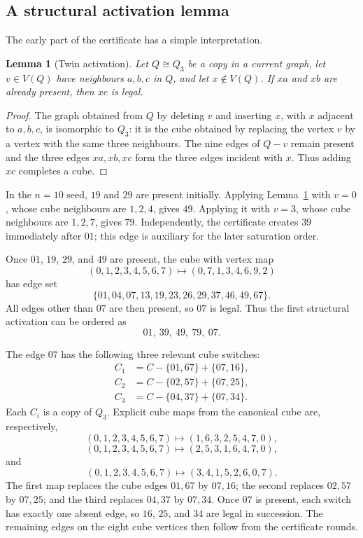 \documentclass[11pt]{article}
\numberwithin{equation}{section}
\newtheorem{lemma}[theorem]{Lemma}
\begin{document}
\subsection{A structural activation lemma}
The early part of the certificate has a simple interpretation.

\begin{lemma}[Twin activation]\label{lem:twin}
Let $Q\cong Q_3$ be a copy in a current graph, let $v\in V(Q)$ have neighbours $a,b,c$ in $Q$, and let $x\notin V(Q)$. If $xa$ and $xb$ are already present, then $xc$ is legal.
\end{lemma}

\begin{proof}
The graph obtained from $Q$ by deleting $v$ and inserting $x$, with $x$ adjacent to $a,b,c$, is isomorphic to $Q_3$: it is the cube obtained by replacing the vertex $v$ by a vertex with the same three neighbours. The nine edges of $Q-v$ remain present and the three edges $xa,xb,xc$ form the three edges incident with $x$. Thus adding $xc$ completes a cube.
\end{proof}

In the $n=10$ seed, $19$ and $29$ are present initially. Applying Lemma~\ref{lem:twin} with $v=0$, whose cube neighbours are $1,2,4$, gives $49$. Applying it with $v=3$, whose cube neighbours are $1,2,7$, gives $79$. Independently, the certificate creates $39$ immediately after $01$; this edge is auxiliary for the later saturation order.

Once $01$, $19$, $29$, and $49$ are present, the cube with vertex map
\[
(0,1,2,3,4,5,6,7)\longmapsto(0,7,1,3,4,6,9,2)
\]
has edge set
\[
\{01,04,07,13,19,23,26,29,37,46,49,67\}.
\]
All edges other than $07$ are then present, so $07$ is legal. Thus the first structural activation can be ordered as
\[
01,\ 39,\ 49,\ 79,\ 07.
\]

The edge $07$ has the following three relevant cube switches:
\[
\begin{aligned}
C_1&=C-\{01,67\}+\{07,16\},\\
C_2&=C-\{02,57\}+\{07,25\},\\
C_3&=C-\{04,37\}+\{07,34\}.
\end{aligned}
\tag{5.3}
\]
Each $C_i$ is a copy of $Q_3$. Explicit cube maps from the canonical cube are, respectively,
\[
(0,1,2,3,4,5,6,7)\mapsto(1,6,3,2,5,4,7,0),
\]
\[
(0,1,2,3,4,5,6,7)\mapsto(2,5,3,1,6,4,7,0),
\]
and
\[
(0,1,2,3,4,5,6,7)\mapsto(3,4,1,5,2,6,0,7).
\]
The first map replaces the cube edges $01,67$ by $07,16$; the second replaces $02,57$ by $07,25$; and the third replaces $04,37$ by $07,34$. Once $07$ is present, each switch has exactly one absent edge, so $16$, $25$, and $34$ are legal in succession. The remaining edges on the eight cube vertices then follow from the certificate rounds.
\end{document}
